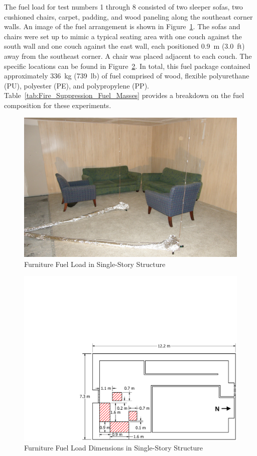 \documentclass[12pt,oneside]{book}
\begin{document}
The fuel load for test numbers 1 through 8 consisted of two sleeper sofas, two cushioned chairs, carpet, padding, and wood paneling along the southeast corner walls. An image of the fuel arrangement is shown in Figure~\ref{fig:Furniture_Fuel_Load}. The sofas and chairs were set up to mimic a typical seating area with one couch against the south wall and one couch against the east wall, each positioned 0.9~m (3.0~ft) away from the southeast corner. A chair was placed adjacent to each couch. The specific locations can be found in Figure~\ref{fig:Furniture_Fuel_Load_Dimensions}. In total, this fuel package contained approximately 336~kg (739~lb) of fuel comprised of wood, flexible polyurethane (PU), polyester (PE), and polypropylene (PP). Table~\ref{tab:Fire_Suppression_Fuel_Masses} provides a breakdown on the fuel composition for these experiments.

\begin{figure}[!ht]
	\includegraphics[width=.8\columnwidth]{../Figures/Pictures/Furniture_Fuel_Load}
	\caption{Furniture Fuel Load in Single-Story Structure}
	\label{fig:Furniture_Fuel_Load}
\end{figure}

\begin{figure}[!ht]
	\includegraphics[width=\columnwidth]{../Figures/Floor_Plans/PDFs/East_Structure/DelCo_2012_East_Structure_Furniture}
	\caption{Furniture Fuel Load Dimensions in Single-Story Structure}
	\label{fig:Furniture_Fuel_Load_Dimensions}
\end{figure}
\end{document}
